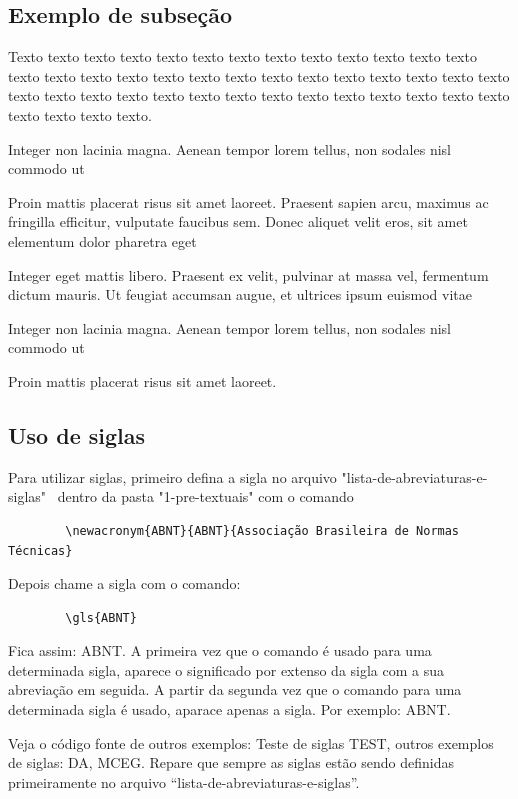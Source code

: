 \subsection{Exemplo de subseção} \label{sec:ex_sec}
	
    Texto texto texto texto texto texto texto texto texto texto texto texto texto texto texto texto texto texto texto texto texto texto texto texto texto texto texto texto texto texto texto texto texto texto texto texto texto texto texto texto texto texto texto texto texto.



    \begin{alineascomponto}
	    \item Integer non lacinia magna. Aenean tempor lorem tellus, non sodales nisl commodo ut
	    \item Proin mattis placerat risus sit amet laoreet. Praesent sapien arcu, maximus ac fringilla efficitur, vulputate faucibus sem. Donec aliquet velit eros, sit amet elementum dolor pharetra eget
	    \item Integer eget mattis libero. Praesent ex velit, pulvinar at massa vel, fermentum dictum mauris. Ut feugiat accumsan augue, et ultrices ipsum euismod vitae
	    \begin{subalineascomponto}
		    \item Integer non lacinia magna. Aenean tempor lorem tellus, non sodales nisl commodo ut
		    \item Proin mattis placerat risus sit amet laoreet.
	    \end{subalineascomponto}
    \end{alineascomponto}

\subsection{Uso de siglas} \label{sec:siglas}

    Para utilizar siglas, primeiro defina a sigla no arquivo "lista-de-abreviaturas-e-siglas"~ dentro da pasta "1-pre-textuais" com o comando 
    \begin{verbatim}
        \newacronym{ABNT}{ABNT}{Associação Brasileira de Normas Técnicas}
    \end{verbatim}
    Depois chame a sigla com o comando:
    \begin{verbatim}
        \gls{ABNT}
    \end{verbatim}
    Fica assim: \gls{ABNT}. A primeira vez que o comando é usado para uma determinada sigla, aparece o significado por extenso da sigla com a sua abreviação em seguida. A partir da segunda vez que o comando para uma determinada sigla é usado, aparace apenas a sigla. Por exemplo: \gls{ABNT}.  
    
    Veja o código fonte de outros exemplos: Teste de siglas \gls{TEST}, outros exemplos de siglas: \gls{DA}, \gls{MCEG}. 
    Repare que sempre as siglas estão sendo definidas primeiramente no arquivo ``lista-de-abreviaturas-e-siglas''.